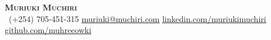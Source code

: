 \begin{center}
    \textbf{\Huge \scshape Muriuki Muchiri} \\ \vspace{1pt}
     \ \small (+254) 705-451-315 \quad
    \href{mailto:muriuki@muchiri.com}{ \underline{muriuki@muchiri.com}} \quad
    \href{https://www.linkedin.com/in/muriukimuchiri/}{ \underline{linkedin.com/muriukimuchiri}} \quad
    \href{https://github.com/muhreeowki}{ \underline{github.com/muhreeowki}}
\end{center}
